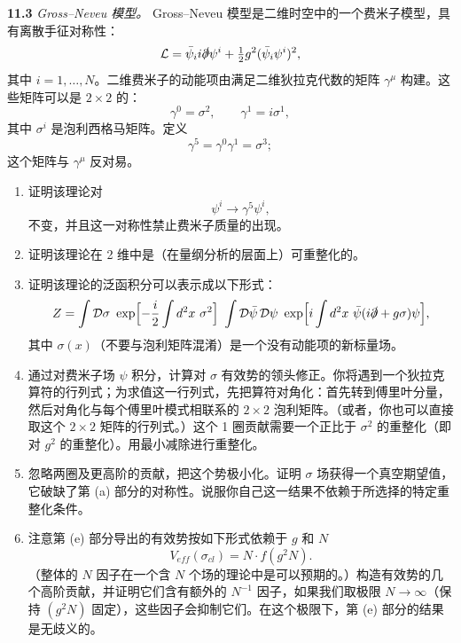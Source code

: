 \textbf{11.3} \emph{Gross--Neveu 模型。} Gross--Neveu 模型是二维时空中的一个费米子模型，具有离散手征对称性：
\begin{equation}
  \mathcal{L} = \bar{\psi}_i i\slashed{\partial}\psi^i
    + \tfrac{1}{2}g^2(\bar{\psi}_i\psi^i)^2 ,
\end{equation}
其中 $i = 1, \ldots, N$。二维费米子的动能项由满足二维狄拉克代数的矩阵 $\gamma^\mu$ 构建。这些矩阵可以是 $2\times2$ 的：
\begin{equation}
  \gamma^0 = \sigma^2,\qquad \gamma^1 = i\sigma^1 ,
\end{equation}
其中 $\sigma^i$ 是泡利西格马矩阵。定义
\begin{equation}
  \gamma^5 = \gamma^0\gamma^1 = \sigma^3 ;
\end{equation}
这个矩阵与 $\gamma^\mu$ 反对易。
\begin{enumerate}[label=(\alph*)]
  \item 证明该理论对
    \begin{equation}
      \psi^i \to \gamma^5\psi^i ,
    \end{equation}
    不变，并且这一对称性禁止费米子质量的出现。
  \item 证明该理论在 2 维中是（在量纲分析的层面上）可重整化的。
  \item 证明该理论的泛函积分可以表示成以下形式：
    \begin{equation}
      Z = \int \mathcal{D}\sigma\ \exp\Bigl[ -\frac{i}{2}\int d^2x\ \sigma^2
        \Bigr]\ \int \mathcal{D}\bar{\psi}\,\mathcal{D}\psi\ \exp\Bigl[
        i\int d^2x\ \bar{\psi}(i\slashed{\partial} + g\sigma)\psi \Bigr] ,
    \end{equation}
    其中 $\sigma(x)$（不要与泡利矩阵混淆）是一个没有动能项的新标量场。
  \item 通过对费米子场 $\psi$ 积分，计算对 $\sigma$ 有效势的领头修正。你将遇到一个狄拉克算符的行列式；为求值这一行列式，先把算符对角化：首先转到傅里叶分量，然后对角化与每个傅里叶模式相联系的 $2\times2$ 泡利矩阵。（或者，你也可以直接取这个 $2\times2$ 矩阵的行列式。）这个 1 圈贡献需要一个正比于 $\sigma^2$ 的重整化（即对 $g^2$ 的重整化）。用最小减除进行重整化。
  \item 忽略两圈及更高阶的贡献，把这个势极小化。证明 $\sigma$ 场获得一个真空期望值，它破缺了第 (a) 部分的对称性。说服你自己这一结果不依赖于所选择的特定重整化条件。
  \item 注意第 (e) 部分导出的有效势按如下形式依赖于 $g$ 和 $N$
    \begin{equation}
      V_{eff}(\sigma_{cl}) = N\cdot f(g^2N) .
    \end{equation}
    （整体的 $N$ 因子在一个含 $N$ 个场的理论中是可以预期的。）构造有效势的几个高阶贡献，并证明它们含有额外的 $N^{-1}$ 因子，如果我们取极限 $N\to\infty$（保持 $(g^2N)$ 固定），这些因子会抑制它们。在这个极限下，第 (e) 部分的结果是无歧义的。
\end{enumerate}
